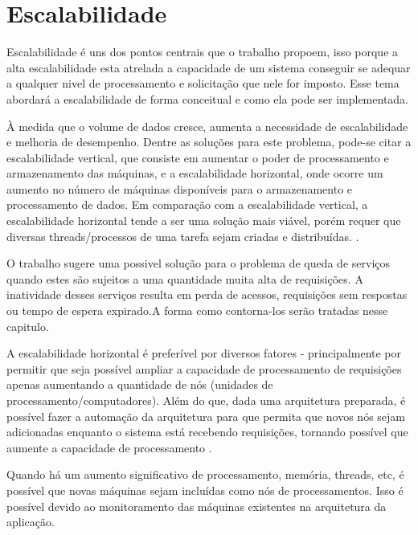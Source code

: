 \chapter{Escalabilidade}\label{escalabilidade}


Escalabilidade é uns dos pontos centrais que o trabalho propoem, isso porque a alta escalabilidade esta
atrelada a capacidade de um sistema conseguir se adequar a qualquer nivel de processamento e solicitação
que nele for imposto. Esse tema abordará a escalabilidade de forma conceitual e como ela pode ser implementada.


\begin{citacao}

À medida que o volume de dados cresce, aumenta a
necessidade de escalabilidade e melhoria de desempenho. Dentre as soluções para este
problema, pode-se citar a escalabilidade vertical, que consiste em aumentar o poder de
processamento e armazenamento das máquinas, e a escalabilidade horizontal, onde ocorre um
aumento no número de máquinas disponíveis para o armazenamento e processamento de
dados. Em comparação com a escalabilidade vertical, a escalabilidade horizontal tende a ser
uma solução mais viável, porém requer que diversas threads/processos de uma tarefa sejam
criadas e distribuídas. \cite[3]{alexandre-morais-souza-2013}.

\end{citacao}


O trabalho sugere uma possivel solução para o problema de queda de serviços quando estes são 
sujeitos a uma quantidade muita alta de requisições. A inatividade desses serviços resulta em perda 
de acessos, requisições sem respostas ou tempo de espera expirado.A forma 
como contorna-los serão tratadas nesse capitulo. 


A escalabilidade horizontal é preferível por diversos fatores - principalmente por
permitir que seja possível ampliar a capacidade de processamento de requisições
apenas aumentando a quantidade de nós (unidades de processamento/computadores).
Além do que, dada uma arquitetura preparada, é possível fazer a automação da
arquitetura para que permita que novos nós sejam adicionadas enquanto o
sistema está recebendo requisições, tornando possível que aumente a capacidade
de processamento \cite{ivens-oliveira-porto-2009}.

Quando há um aumento significativo de processamento, memória, threads, etc,
é possível que novas máquinas sejam incluídas como nós de processamentos.
Isso é possível devido ao monitoramento das máquinas existentes na arquitetura
da aplicação.

